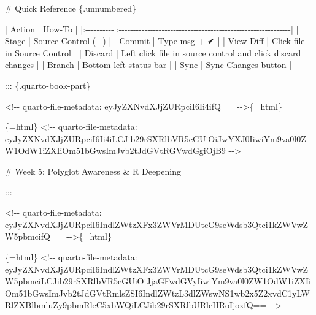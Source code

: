 \documentclass[
  letterpaper,
  DIV=11,
  numbers=noendperiod,
  oneside]{scrreprt}
\newenvironment{Shaded}{\begin{snugshade}}{\end{snugshade}}
\newcommand{\FunctionTok}[1]{\textcolor[rgb]{0.28,0.35,0.67}{#1}}
\newcommand{\InformationTok}[1]{\textcolor[rgb]{0.37,0.37,0.37}{#1}}
\newcommand{\NormalTok}[1]{\textcolor[rgb]{0.00,0.23,0.31}{#1}}
\newcommand{\PreprocessorTok}[1]{\textcolor[rgb]{0.68,0.00,0.00}{#1}}
\begin{document}
\begin{Shaded}
\begin{Highlighting}[numbers=left,,]
\FunctionTok{\# Quick Reference \{.unnumbered\}}


\PreprocessorTok{|}\NormalTok{ Action    }\PreprocessorTok{|}\NormalTok{ How{-}To                                                      }\PreprocessorTok{|}
\PreprocessorTok{|:{-}{-}{-}{-}{-}{-}{-}{-}{-}{-}|:{-}{-}{-}{-}{-}{-}{-}{-}{-}{-}{-}{-}{-}{-}{-}{-}{-}{-}{-}{-}{-}{-}{-}{-}{-}{-}{-}{-}{-}{-}{-}{-}{-}{-}{-}{-}{-}{-}{-}{-}{-}{-}{-}{-}{-}{-}{-}{-}{-}{-}{-}{-}{-}{-}{-}{-}{-}{-}{-}{-}|}
\PreprocessorTok{|}\NormalTok{ Stage     }\PreprocessorTok{|}\NormalTok{ Source Control (+)                                          }\PreprocessorTok{|}
\PreprocessorTok{|}\NormalTok{ Commit    }\PreprocessorTok{|}\NormalTok{ Type msg + ✔                                                }\PreprocessorTok{|}
\PreprocessorTok{|}\NormalTok{ View Diff }\PreprocessorTok{|}\NormalTok{ Click file in Source Control                                }\PreprocessorTok{|}
\PreprocessorTok{|}\NormalTok{ Discard   }\PreprocessorTok{|}\NormalTok{ Left click file in source control and click discard changes }\PreprocessorTok{|}
\PreprocessorTok{|}\NormalTok{ Branch    }\PreprocessorTok{|}\NormalTok{ Bottom{-}left status bar                                      }\PreprocessorTok{|}
\PreprocessorTok{|}\NormalTok{ Sync      }\PreprocessorTok{|}\NormalTok{ Sync Changes button                                         }\PreprocessorTok{|}


\NormalTok{::: \{.quarto{-}book{-}part\}}


\InformationTok{\textasciigrave{}\textless{}!{-}{-} quarto{-}file{-}metadata: eyJyZXNvdXJjZURpciI6Ii4ifQ== {-}{-}\textgreater{}\textasciigrave{}}\NormalTok{\{=html\}}

\InformationTok{\textasciigrave{}\textasciigrave{}\textasciigrave{}\{=html\}}
\InformationTok{\textless{}!{-}{-} quarto{-}file{-}metadata: eyJyZXNvdXJjZURpciI6Ii4iLCJib29rSXRlbVR5cGUiOiJwYXJ0IiwiYm9va0l0ZW1OdW1iZXIiOm51bGwsImJvb2tJdGVtRGVwdGgiOjB9 {-}{-}\textgreater{}}
\InformationTok{\textasciigrave{}\textasciigrave{}\textasciigrave{}}

\FunctionTok{\# Week 5: Polyglot Awareness \& R Deepening}


\NormalTok{:::}



\InformationTok{\textasciigrave{}\textless{}!{-}{-} quarto{-}file{-}metadata: eyJyZXNvdXJjZURpciI6IndlZWtzXFx3ZWVrMDUtcG9seWdsb3Qtci1kZWVwZW5pbmcifQ== {-}{-}\textgreater{}\textasciigrave{}}\NormalTok{\{=html\}}

\InformationTok{\textasciigrave{}\textasciigrave{}\textasciigrave{}\{=html\}}
\InformationTok{\textless{}!{-}{-} quarto{-}file{-}metadata: eyJyZXNvdXJjZURpciI6IndlZWtzXFx3ZWVrMDUtcG9seWdsb3Qtci1kZWVwZW5pbmciLCJib29rSXRlbVR5cGUiOiJjaGFwdGVyIiwiYm9va0l0ZW1OdW1iZXIiOm51bGwsImJvb2tJdGVtRmlsZSI6IndlZWtzL3dlZWswNS1wb2x5Z2xvdC1yLWRlZXBlbmluZy9pbmRleC5xbWQiLCJib29rSXRlbURlcHRoIjoxfQ== {-}{-}\textgreater{}}
\InformationTok{\textasciigrave{}\textasciigrave{}\textasciigrave{}}


\end{Highlighting}
\end{Shaded}
\end{document}
